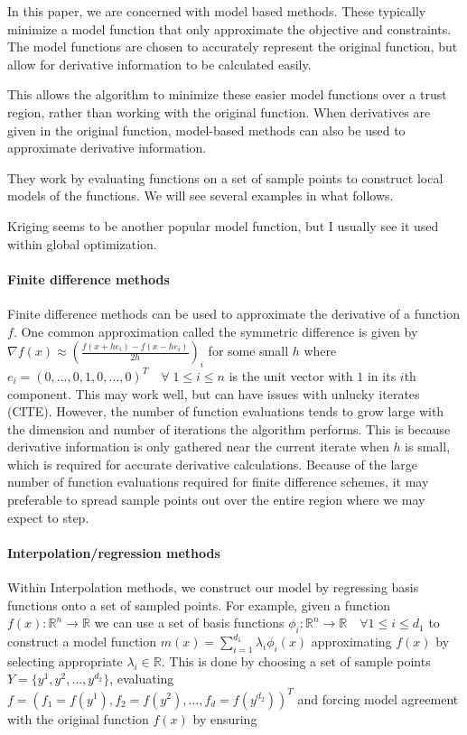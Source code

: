 \documentclass{article}
\begin{document}
In this paper, we are concerned with model based methods.
These typically minimize a model function that only approximate the objective and constraints.
The model functions are chosen to accurately represent the original function, but allow for derivative information to be calculated easily.

This allows the algorithm to minimize these easier model functions over a trust region, rather than working with the original function.
When derivatives are given in the original function, model-based methods can also be used to approximate derivative information.

They work by evaluating functions on a set of sample points to construct local models of the functions.
We will see several examples in what follows.


\color{red}
Kriging seems to be another popular model function, but I usually see it used within global optimization.
\color{black}


\paragraph{Finite difference methods}

Finite difference methods can be used to approximate the derivative of a function $f$.
One common approximation called the symmetric difference is given by $\nabla f(x) \approx (\frac{f(x+he_i) - f(x-he_i)}{2h})_i$ for some small $h$ where $e_i = (0,\ldots, 0, 1, 0, \ldots, 0)^T \quad \forall \; 1 \le i \le n$ is the unit vector with $1$ in its $i$th component.
This may work well, but can have issues with unlucky iterates (CITE).
However, the number of function evaluations tends to grow large with the dimension and number of iterations the algorithm performs.
This is because derivative information is only gathered near the current iterate when $h$ is small, which is required for accurate derivative calculations.
Because of the large number of function evaluations required for finite difference schemes, it may preferable to spread sample points out over the entire region where we may expect to step.



\paragraph{Interpolation/regression methods}

Within Interpolation methods, we construct our model by regressing basis functions onto a set of sampled points.
For example, given a function $f(x) : \mathbb R^n \to \mathbb R$ we can use a set of basis functions $\phi_i : \mathbb R^n \to \mathbb R \quad \forall 1 \le i \le d_1$ to construct a model function $m(x) = \sum_{i=1}^{d_1} \lambda_i \phi_i(x)$ approximating $f(x)$ by selecting appropriate $\lambda_i \in \mathbb R$.
This is done by choosing a set of sample points
$Y = \{y^1, y^2, \ldots, y^{d_2}\}$,
evaluating $f = (f_1 = f(y^1), f_2 = f(y^2), \ldots, f_d = f(y^{d_2}))^T$ and forcing model agreement with the original function $f(x)$ by ensuring
\end{document}
